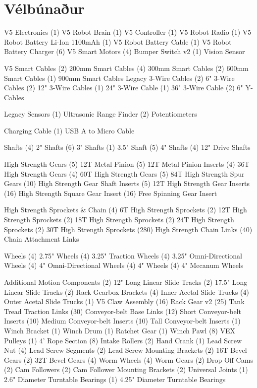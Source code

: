 \section{Vélbúnaður}
V5 Electronics
(1) V5 Robot Brain
(1) V5 Controller
(1) V5 Robot Radio
(1) V5 Robot Battery Li-Ion 1100mAh
(1) V5 Robot Battery Cable
(1) V5 Robot Battery Charger
(6) V5 Smart Motors
(4) Bumper Switch v2
(1) Vision Sensor

V5 Smart Cables
(2) 200mm Smart Cables
(4) 300mm Smart Cables
(2) 600mm Smart Cables
(1) 900mm Smart Cables
Legacy 3-Wire Cables
(2) 6" 3-Wire Cables
(2) 12" 3-Wire Cables
(1) 24" 3-Wire Cable
(1) 36" 3-Wire Cable
(2) 6" Y-Cables

Legacy Sensors
(1) Ultrasonic Range Finder
(2) Potentiometers

Charging Cable
(1) USB A to Micro Cable


Shafts
(4) 2" Shafts
(6) 3" Shafts
(1) 3.5" Shaft
(5) 4" Shafts
(4) 12" Drive Shafts

High Strength Gears
(5) 12T Metal Pinion
(5) 12T Metal Pinion Inserts
(4) 36T High Strength Gears
(4) 60T High Strength Gears
(5) 84T High Strength Spur Gears
(10) High Strength Gear Shaft Inserts
(5) 12T High Strength Gear Inserts
(16) High Strength Square Gear Insert
(16) Free Spinning Gear Insert

High Strength Sprockets & Chain
(4) 6T High Strength Sprockets
(2) 12T High Strength Sprockets
(2) 18T High Strength Sprockets
(2) 24T High Strength Sprockets
(2) 30T High Strength Sprockets
(280) High Strength Chain Links
(40) Chain Attachment Links

Wheels
(4) 2.75" Wheels
(4) 3.25" Traction Wheels
(4) 3.25" Omni-Directional Wheels
(4) 4" Omni-Directional Wheels
(4) 4" Wheels
(4) 4" Mecanum Wheels

Additional Motion Components
(2) 12" Long Linear Slide Tracks
(2) 17.5" Long Linear Slide Tracks
(2) Rack Gearbox Brackets
(4) Inner Acetal Slide Trucks
(4) Outer Acetal Slide Trucks
(1) V5 Claw Assembly
(16) Rack Gear v2
(25) Tank Tread Traction Links
(30) Conveyor-belt Base Links
(12) Short Conveyor-belt Inserts
(10) Medium Conveyor-belt Inserts
(10) Tall Conveyor-belt Inserts
(1) Winch Bracket
(1) Winch Drum
(1) Ratchet Gear
(1) Winch Pawl
(8) VEX Pulleys
(1) 4' Rope Section
(8) Intake Rollers
(2) Hand Crank
(1) Lead Screw Nut
(4) Lead Screw Segments
(2) Lead Screw Mounting Brackets
(2) 16T Bevel Gears
(2) 32T Bevel Gears
(4) Worm Wheels
(4) Worm Gears
(2) Drop Off Cams
(2) Cam Followers
(2) Cam Follower Mounting Brackets
(2) Universal Joints
(1) 2.6" Diameter Turntable Bearings
(1) 4.25" Diameter Turntable Bearings


